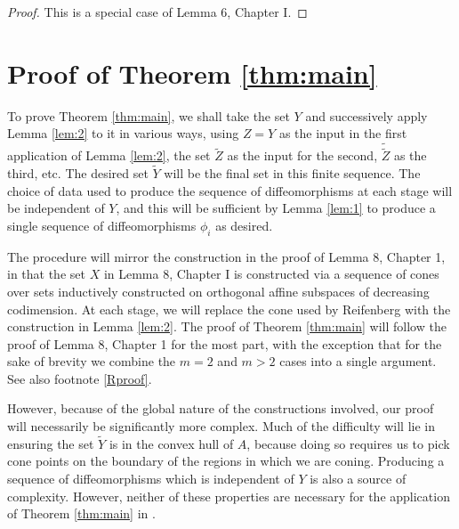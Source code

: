 \documentclass[10pt]{amsart}
\theoremstyle{definition}
\theoremstyle{definition}
\theoremstyle{definition}
\theoremstyle{definition}
\theoremstyle{definition}
\theoremstyle{definition}
\theoremstyle{definition}
\newcommand{\<}{\langle}
\renewcommand{\>}{\rangle}
\begin{document}
\begin{proof}
	This is a special case of \cite{reifenberg} Lemma 6, Chapter I.
\end{proof}

\section{Proof of Theorem \ref{thm:main}}

	To prove Theorem \ref{thm:main}, we shall take the set \( Y \) and successively apply Lemma \ref{lem:2} to it in various ways, using \( Z=Y \) as the input in the first application of Lemma \ref{lem:2}, the set \( \tilde{Z} \) as the input for the second, \( \tilde{\tilde{Z}} \) as the third, etc. The desired set \( \tilde{Y} \) will be the final set in this finite sequence. The choice of data used to produce the sequence of diffeomorphisms at each stage will be independent of \( Y \), and this will be sufficient by Lemma \ref{lem:1} to produce a single sequence of diffeomorphisms \( \phi_i \) as desired.
	
	The procedure will mirror the construction in the proof of \cite{reifenberg} Lemma 8, Chapter 1, in that the set \( X \) in \cite{reifenberg} Lemma 8, Chapter I is constructed via a sequence of cones over sets inductively constructed on orthogonal affine subspaces of decreasing codimension. At each stage, we will replace the cone used by Reifenberg with the construction in Lemma \ref{lem:2}. The proof of Theorem \ref{thm:main} will follow the proof of \cite{reifenberg} Lemma 8, Chapter 1 for the most part, with the exception that for the sake of brevity we combine the \( m=2 \) and \( m>2 \) cases into a single argument. See also footnote \ref{Rproof}. 
	
	However, because of the global nature of the constructions involved, our proof will necessarily be significantly more complex. Much of the difficulty will lie in ensuring the set \( \tilde{Y} \) is in the convex hull of \( A \), because doing so requires us to pick cone points on the boundary of the regions in which we are coning. Producing a sequence of diffeomorphisms which is independent of \( Y \) is also a source of complexity. However, neither of these properties are necessary for the application of Theorem \ref{thm:main} in \cite{elliptic}.
	
\end{document}
